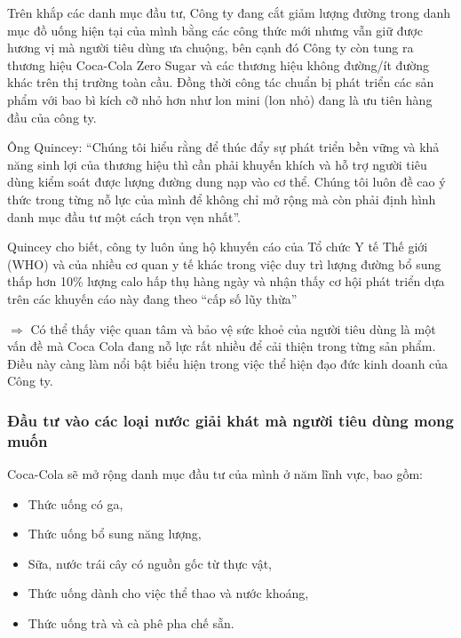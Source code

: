 \documentclass{article}
\begin{document}
    \vspace{0.2cm}
    Trên khắp các danh mục đầu tư, Công ty đang cắt giảm lượng đường trong danh  mục đồ uống hiện tại của mình bằng các công thức mới nhưng vẫn giữ được hương vị mà người tiêu dùng ưa chuộng, bên cạnh đó Công ty còn tung ra thương hiệu Coca-Cola Zero Sugar và các thương hiệu không đường/ít đường khác trên thị trường toàn cầu. Đồng thời công tác chuẩn bị phát triển các sản phẩm với bao bì kích cỡ nhỏ hơn như lon mini (lon nhỏ) đang là ưu tiên hàng đầu của công ty.

    \vspace{0.2cm}
    Ông Quincey: “Chúng tôi hiểu rằng để thúc đẩy sự phát triển bền vững và khả năng sinh lợi của thương hiệu thì cần phải khuyến khích và hỗ trợ người tiêu dùng kiểm soát được lượng đường dung nạp vào cơ thể. Chúng tôi luôn đề cao ý thức trong từng nỗ lực của mình để không chỉ mở rộng mà còn phải định hình danh mục đầu tư một cách trọn vẹn nhất”.

    \vspace{0.2cm}
    Quincey cho biết, công ty luôn ủng hộ khuyến cáo của Tổ chức Y tế Thế giới (WHO) và của nhiều cơ quan y tế khác trong việc duy trì lượng đường bổ sung thấp hơn 10\% lượng calo hấp thụ hàng ngày và nhận thấy cơ hội phát triển dựa trên các khuyến cáo này đang theo “cấp số lũy thừa”

    \vspace{0.2cm}
    $\Rightarrow$ Có thể thấy việc quan tâm và bảo vệ sức khoẻ của người tiêu dùng là một vấn đề  mà Coca Cola đang nỗ lực rất nhiều  để cải thiện trong từng sản phẩm. Điều này càng làm nổi bật biểu hiện trong việc thể hiện đạo đức kinh doanh của Công ty.

    \subsubsection{Đầu tư vào các loại nước giải khát mà người tiêu dùng mong muốn}
    \vspace{0.2cm}
    Coca-Cola sẽ mở rộng danh mục đầu tư của mình ở năm lĩnh vực, bao gồm: 
    \begin{itemize}
        \item Thức uống có ga,
        \item Thức uống bổ sung năng lượng,
        \item Sữa, nước trái cây có nguồn gốc từ thực vật,
        \item Thức uống dành cho việc thể thao và nước khoáng,
        \item Thức uống trà và cà phê pha chế sẵn.
    \end{itemize}
\end{document}
